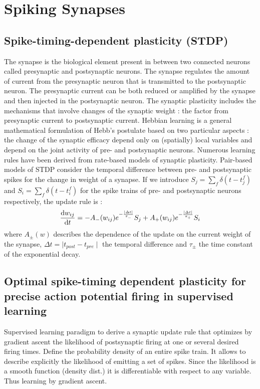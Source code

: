 \documentclass[12pt]{article}
\begin{document}
\section{Spiking Synapses}

\subsection{Spike-timing-dependent plasticity (STDP) \cite{gerstner2014neuronal}}
The synapse is the biological element present in between two connected neurons called presynaptic and postsynaptic neurons. The synapse regulates the amount of current from the presynaptic neuron that is transmitted to the postsynaptic neuron. The presynaptic current can be both reduced or amplified by the synapse and then injected in the postsynaptic neuron. The synaptic plasticity includes the mechanisms that involve changes of the synaptic weight : the factor from presynaptic current to postsynaptic current.
Hebbian learning is a general mathematical formulation of Hebb's postulate based on two particular aspects : the change of the synaptic efficacy depend only on (spatially) local variables and depend on the joint activity of pre- and postsynaptic neurons. Numerous learning rules have been derived from rate-based models of synaptic plasticity. Pair-based models of STDP consider the temporal difference between pre- and postsynaptic spikes for the change in weight of a synapse. If we introduce $S_j = \sum_f \delta(t-t^f_j)$ and $S_i = \sum_f \delta(t-t^f_i)$ for the spike trains of pre- and postsynaptic neurons respectively, the update rule is : 
\begin{equation}
\frac{\textnormal{d} w_{ij}}{\textnormal{d}t} =
- A_- (w_{ij}) e^{- \frac{\mid \Delta t \mid}{\tau_-}} S_j + 
A_+ (w_{ij}) e^{- \frac{\mid \Delta t \mid}{\tau_+}} S_i
\end{equation}
where $A_{\pm}(w)$ describes the dependence of the update on the current weight of the synapse, $\Delta t = \mid t_{post}-t_{pre} \mid$ the temporal difference and $\tau_\pm$ the time constant of the exponential decay.

\subsection{Optimal spike-timing dependent plasticity for precise action potential firing in supervised learning \cite{pfister2006optimal}}

Supervised learning paradigm to derive a synaptic update rule that optimizes by gradient ascent the likelihood of postsynaptic firing at one or several desired firing times.
Define the probability density of an entire spike train. It allows to describe explicitly the likelihood of emitting a set of spikes. Since the likelihood is a smooth function (density dist.) it is differentiable with respect to any variable. Thus learning by gradient ascent.
\end{document}
